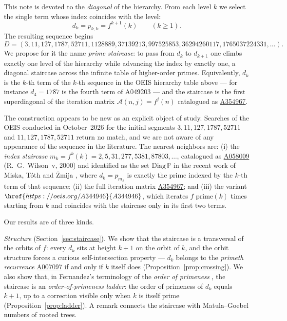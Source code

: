 \documentclass[11pt,a4paper]{article}
\theoremstyle{plain}
\theoremstyle{definition}
\newcommand{\Pset}{\mathbb{P}}
\begin{document}
This note is devoted to the \emph{diagonal} of the hierarchy. From each
level $k$ we select the single term whose index coincides with the level:
\begin{equation}\label{eq:staircase}
  d_k=p_{k,k}=f^{k+1}(k)\qquad(k\ge 1).
\end{equation}
The resulting sequence begins
\[
  D=(3,11,127,1787,52711,1128889,37139213,997525853,36294260117,
  1765037224331,\ldots).
\]
We propose for it the name \emph{prime staircase}: to pass from $d_k$ to
$d_{k+1}$ one climbs exactly one level of the hierarchy while advancing the
index by exactly one, a diagonal staircase across the infinite table of
higher-order primes. Equivalently, $d_k$ is the $k$-th term of the $k$-th
sequence in the OEIS hierarchy table above --- for instance $d_4=1787$ is
the fourth term of A049203 --- and the staircase is the first superdiagonal
of the iteration matrix $\mathcal{A}(n,j)=f^{j}(n)$ catalogued as
\href{https://oeis.org/A354967}{A354967}.

The construction appears to be new as an explicit object of study. Searches
of the OEIS conducted in October~2026 for the initial segments
$3,11,127,1787,52711$ and $11,127,1787,52711$ return no match, and we are
not aware of any appearance of the sequence in the literature. The nearest
neighbors are: (i) the \emph{index staircase} $m_k=f^{k}(k)=2, 5, 31, 277,
5381, 87803,\ldots$, catalogued as
\href{https://oeis.org/A058009}{A058009} (R.~G.~Wilson~v, 2000) and
identified as the set $\mathrm{Diag}\,\Pset$ in the recent work of Miska,
T\'oth and \.Zmija \cite{MiskaTothZmija}, where $d_k=p_{m_k}$ is exactly the
prime indexed by the $k$-th term of that sequence; (ii) the full iteration
matrix \href{https://oeis.org/A354967}{A354967}; and (iii) the variant
$\href{https://oeis.org/A344946}{A344946}$, which iterates $f$ prime$(k)$
times starting from $k$ and coincides with the staircase only in its first
two terms.

Our results are of three kinds.

\emph{Structure} (Section~\ref{sec:staircase}). We show that the staircase
is a transversal of the orbits of $f$: every $d_k$ sits at height $k+1$ on
the orbit of $k$, and the orbit structure forces a curious
self-intersection property --- $d_k$ belongs to the \emph{primeth recurrence}
\href{https://oeis.org/A007097}{A007097} if and only if $k$ itself does
(Proposition~\ref{prop:crossing}). We also show that, in Fernandez's
terminology of the \emph{order of primeness} \cite{Fernandez}, the staircase
is an \emph{order-of-primeness ladder}: the order of primeness of $d_k$
equals $k+1$, up to a correction visible only when $k$ is itself prime
(Proposition~\ref{prop:ladder}). A remark connects the staircase with
Matula--Goebel numbers of rooted trees.
\end{document}
